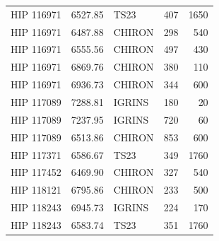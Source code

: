 {\begin{scriptsize}
\begin{longtable}{|l|rlrr|}
  HIP 116971 &  6527.85 &       TS23 &      407 &  1650 \\
  HIP 116971 &  6487.88 &     CHIRON &      298 &   540 \\
  HIP 116971 &  6555.56 &     CHIRON &      497 &   430 \\
  HIP 116971 &  6869.76 &     CHIRON &      380 &   110 \\
  HIP 116971 &  6936.73 &     CHIRON &      344 &   600 \\
  HIP 117089 &  7288.81 &     IGRINS &      180 &    20 \\
  HIP 117089 &  7237.95 &     IGRINS &      720 &    60 \\
  HIP 117089 &  6513.86 &     CHIRON &      853 &   600 \\
  HIP 117371 &  6586.67 &       TS23 &      349 &  1760 \\
  HIP 117452 &  6469.90 &     CHIRON &      327 &   540 \\
  HIP 118121 &  6795.86 &     CHIRON &      233 &   500 \\
  HIP 118243 &  6945.73 &     IGRINS &      224 &   170 \\
  HIP 118243 &  6583.74 &       TS23 &      351 &  1760

\end{longtable}
\end{scriptsize}
}



